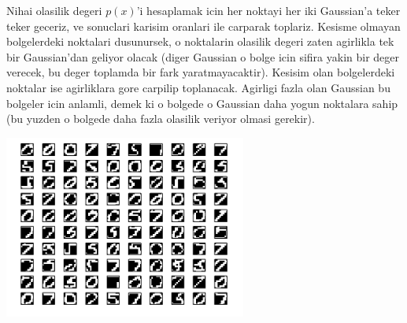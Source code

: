 \documentclass[12pt,fleqn]{article}\usepackage{../common}
\begin{document}
Nihai olasilik degeri $p(x)$'i hesaplamak icin her noktayi her iki
Gaussian'a teker teker geceriz, ve sonuclari karisim oranlari ile carparak
toplariz. Kesisme olmayan bolgelerdeki noktalari dusunursek, o noktalarin
olasilik degeri zaten agirlikla tek bir Gaussian'dan geliyor olacak (diger
Gaussian o bolge icin sifira yakin bir deger verecek, bu deger toplamda bir
fark yaratmayacaktir). Kesisim olan bolgelerdeki noktalar ise agirliklara
gore carpilip toplanacak. Agirligi fazla olan Gaussian bu bolgeler icin
anlamli, demek ki o bolgede o Gaussian daha yogun noktalara sahip (bu
yuzden o bolgede daha fazla olasilik veriyor olmasi gerekir). 



\includegraphics[height=6cm]{digits.png}
\end{document}
